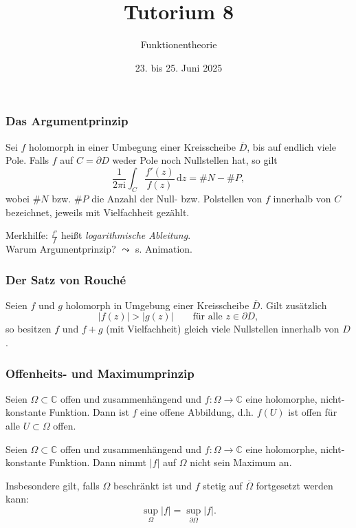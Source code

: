 \documentclass[10pt]{beamer}
\author[\url{https://fdf-uni.github.io/ft}]{}
\title{Tutorium 8}
\subtitle{\texorpdfstring{Funktionentheorie\vspace*{-1.5cm}}{Funktionentheorie}}
\date{23. bis 25. Juni 2025}
\newcommand{\iu}{\mathrm{i}}
\begin{document}
\begin{frame}
	\titlepage
\end{frame}
\begin{frame}
	\frametitle{Das Argumentprinzip}
	\begin{theorem}
		Sei $f$ holomorph in einer Umbegung einer Kreisscheibe $\overline{D}$, bis auf endlich viele Pole.
		Falls $f$ auf $C = \partial D$ weder Pole noch Nullstellen hat, so gilt
		\[
			\frac{1}{2 \pi \iu} \int_{C} \frac{f'(z)}{f(z)} \,\mathrm{d}z = \# N - \# P,
		\]
		wobei $\# N$ bzw. $\# P$ die Anzahl der Null- bzw. Polstellen von $f$ innerhalb von $C$ bezeichnet, jeweils mit Vielfachheit gezählt.
	\end{theorem}
	\pause
	Merkhilfe: $\frac{f'}{f}$ heißt \emph{logarithmische Ableitung}.\\
	\pause
	Warum Argumentprinzip? \pause $\leadsto$ s. Animation.
\end{frame}
\begin{frame}
	\frametitle{Der Satz von Rouché}
	\pause
	\begin{theorem}
		Seien $f$ und $g$ holomorph in Umgebung einer Kreisscheibe $\overline{D}$.
		Gilt zusätzlich
		\[
			\lvert f(z) \rvert > \lvert g(z) \rvert \qquad \text{für alle } z \in \partial D,
		\]
		so besitzen $f$ und $f + g$ (mit Vielfachheit) gleich viele Nullstellen innerhalb von $D$.
	\end{theorem}
\end{frame}
\begin{frame}
	\frametitle{Offenheits- und Maximumprinzip}
	\pause
	\begin{theorem}
		Seien $\Omega \subset \mathbb{C}$ offen und zusammenhängend und $f \colon \Omega \to \mathbb{C}$ eine holomorphe, nicht-konstante Funktion.
		Dann ist $f$ eine offene Abbildung, d.h. $f(U)$ ist offen für alle $U \subset \Omega$ offen.
	\end{theorem}
	\pause
	\begin{theorem}[Maximumprinzip]
		Seien $\Omega \subset \mathbb{C}$ offen und zusammenhängend und $f \colon \Omega \to \mathbb{C}$ eine holomorphe, nicht-konstante Funktion.
		Dann nimmt $\lvert f \rvert$ auf $\Omega$ nicht sein Maximum an.

		Insbesondere gilt, falls $\Omega$ beschränkt ist und $f$ stetig auf $\overline{\Omega}$ fortgesetzt werden kann:
		\[
			\sup_{\Omega} \lvert f \rvert = \sup_{\partial \Omega} \lvert f \rvert.
		\]
	\end{theorem}
\end{frame}
\end{document}

